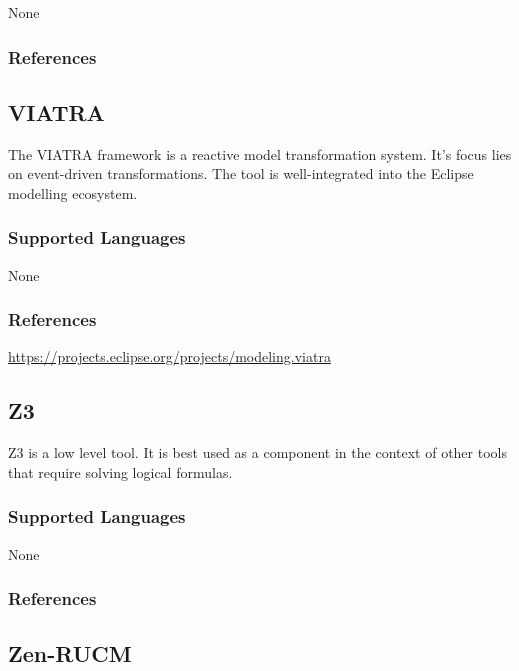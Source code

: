 None


\subsubsection{References}





\subsection{VIATRA}
\label{subsecT:VIATRA}

The VIATRA framework is a reactive model transformation system. It's focus lies on event-driven transformations.
The tool is well-integrated into the Eclipse modelling ecosystem.

\subsubsection{Supported Languages}

None


\subsubsection{References}


\url{https://projects.eclipse.org/projects/modeling.viatra}


\subsection{Z3}
\label{subsecT:Z3}


Z3 is a low level tool. It is best used as a component in the context of other tools that require solving logical formulas.

\subsubsection{Supported Languages}

None


\subsubsection{References}





\subsection{Zen-RUCM}
\label{subsecT:Zen-RUCM}

